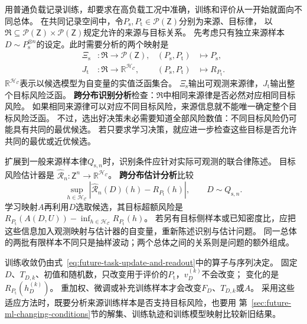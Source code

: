 用普通负载记录训练，却要求在高负载工况中准确，训练和评价从一开始就面向不同总体。
在共同记录空间中，令$P_{\mathrm s},P_{\mathrm t}\in\mathcal P(\mathsf Z)$分别为来源、目标律，
以$\mathfrak R\subseteq\mathcal P(\mathsf Z)\times\mathcal P(\mathsf Z)$规定允许的来源与目标关系。
先考虑只有独立来源样本$D\sim P_{\mathrm s}^{\otimes n}$的设定。此时需要分析的两个映射是
\begin{equation}
  \begin{aligned}
    \Xi_{\mathrm s}&:\mathfrak R\to\mathcal P(\mathsf Z),
      &(P_{\mathrm s},P_{\mathrm t})&\mapsto P_{\mathrm s},\\
    J_{\mathrm t}&:\mathfrak R\to\mathbb R^{\mathcal H_{\mathcal C}},
      &(P_{\mathrm s},P_{\mathrm t})&\mapsto R_{P_{\mathrm t}}.
  \end{aligned}
  \label{eq:future-task-source-target-maps}
\end{equation}
$\mathbb R^{\mathcal H_{\mathcal C}}$表示以候选模型为自变量的实值泛函集合。
$\Xi_{\mathrm s}$输出可观测来源律，$J_{\mathrm t}$输出整个目标风险泛函。
\textbf{跨分布识别分析}检查：$\mathfrak R$中相同来源律是否必然对应相同目标风险。
如果相同来源律可以对应不同目标风险，来源信息就不能唯一确定整个目标风险泛函。
不过，选出好决策未必需要知道全部风险数值：不同目标风险仍可能具有共同的最优候选。
若只要求学习决策，就应进一步检查这些目标是否允许共同的最优或近优候选。

扩展到一般来源样本律$Q_{{\mathrm s},n}$时，识别条件应针对实际可观测的联合律陈述。
目标风险估计器是
$\widehat{\mathcal R}_n:\mathsf Z^n\to\mathbb R^{\mathcal H_{\mathcal C}}$。
\textbf{跨分布估计分析}比较
\[
  \sup_{h\in\mathcal H_{\mathcal C}}
    |\widehat{\mathcal R}_n(D)(h)-R_{P_{\mathrm t}}(h)|,
  \qquad D\sim Q_{{\mathrm s},n}.
\]
学习映射$A$再利用$D$选取候选，其目标超额风险是
$R_{P_{\mathrm t}}(A(D,U))-\inf_{h\in\mathcal H_{\mathcal C}}R_{P_{\mathrm t}}(h)$。
若另有目标侧样本或已知密度比，应把这些信息加入观测映射与估计器的自变量，重新陈述识别与估计问题。
同一总体的两批有限样本不同只是抽样波动；两个总体之间的关系则是问题的额外组成。

训练收敛仍由式~\eqref{eq:future-task-update-and-readout}中的算子与序列决定。
固定$D$、$T_{D,k}$、初值和随机数，只改变用于评价的$P_{\mathrm t}$，$v_D^{(k)}$不会改变；
变化的是$R_{P_{\mathrm t}}(h_D^{(k)})$。
重加权、微调或补充训练样本才会改变$F_D$、$T_{D,k}$或$A$。
采用这些适应方法时，既要分析来源训练样本是否支持目标风险，也要用
第~\ref{sec:future-ml-changing-conditions}节的解集、训练轨迹和训练模型映射比较新旧结果。

